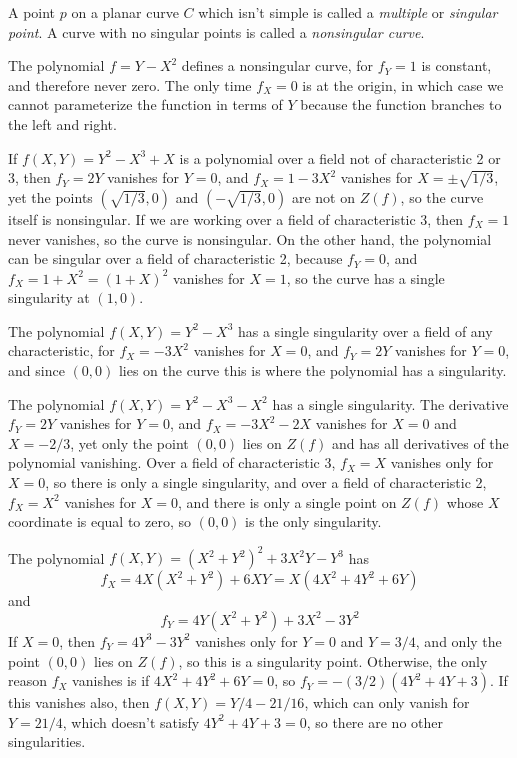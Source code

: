 A point $p$ on a planar curve $C$ which isn't simple is called a \emph{multiple} or \emph{singular point}. A curve with no singular points is called a \emph{nonsingular curve}.

\begin{example}
    The polynomial $f = Y - X^2$ defines a nonsingular curve, for $f_Y = 1$ is constant, and therefore never zero. The only time $f_X = 0$ is at the origin, in which case we cannot parameterize the function in terms of $Y$ because the function branches to the left and right.
\end{example}

\begin{example}
    If $f(X,Y) = Y^2 - X^3 + X$ is a polynomial over a field not of characteristic 2 or 3, then $f_Y = 2Y$ vanishes for $Y = 0$, and $f_X = 1 - 3X^2$ vanishes for $X = \pm \sqrt{1/3}$, yet the points $(\sqrt{1/3},0)$ and $(-\sqrt{1/3},0)$ are not on $Z(f)$, so the curve itself is nonsingular. If we are working over a field of characteristic 3, then $f_X = 1$ never vanishes, so the curve is nonsingular. On the other hand, the polynomial can be singular over a field of characteristic 2, because $f_Y = 0$, and $f_X = 1 + X^2 = (1 + X)^2$ vanishes for $X = 1$, so the curve has a single singularity at $(1,0)$.
\end{example}

\begin{example}
    The polynomial $f(X,Y) = Y^2 - X^3$ has a single singularity over a field of any characteristic, for $f_X = -3X^2$ vanishes for $X = 0$, and $f_Y = 2Y$ vanishes for $Y = 0$, and since $(0,0)$ lies on the curve this is where the polynomial has a singularity.
\end{example}

\begin{example}
    The polynomial $f(X,Y) = Y^2 - X^3 - X^2$ has a single singularity. The derivative $f_Y = 2Y$ vanishes for $Y = 0$, and $f_X = -3X^2 - 2X$ vanishes for $X = 0$ and $X = -2/3$, yet only the point $(0,0)$ lies on $Z(f)$ and has all derivatives of the polynomial vanishing. Over a field of characteristic 3, $f_X = X$ vanishes only for $X = 0$, so there is only a single singularity, and over a field of characteristic 2, $f_X = X^2$ vanishes for $X = 0$, and there is only a single point on $Z(f)$ whose $X$ coordinate is equal to zero, so $(0,0)$ is the only singularity.
\end{example}

\begin{example}
    The polynomial $f(X,Y) = (X^2 + Y^2)^2 + 3X^2Y - Y^3$ has
    \[ f_X = 4X(X^2 + Y^2) + 6XY = X(4X^2 + 4Y^2 + 6Y) \]
    and
    \[ f_Y = 4Y(X^2 + Y^2) + 3X^2 - 3Y^2 \]
    If $X = 0$, then $f_Y = 4Y^3 - 3Y^2$ vanishes only for $Y = 0$ and $Y = 3/4$, and only the point $(0,0)$ lies on $Z(f)$, so this is a singularity point. Otherwise, the only reason $f_X$ vanishes is if $4X^2 + 4Y^2 + 6Y = 0$, so $f_Y = -(3/2)(4Y^2 + 4Y + 3)$. If this vanishes also, then $f(X,Y) = Y/4 - 21/16$, which can only vanish for $Y = 21/4$, which doesn't satisfy $4Y^2 + 4Y + 3 = 0$, so there are no other singularities.
\end{example}

